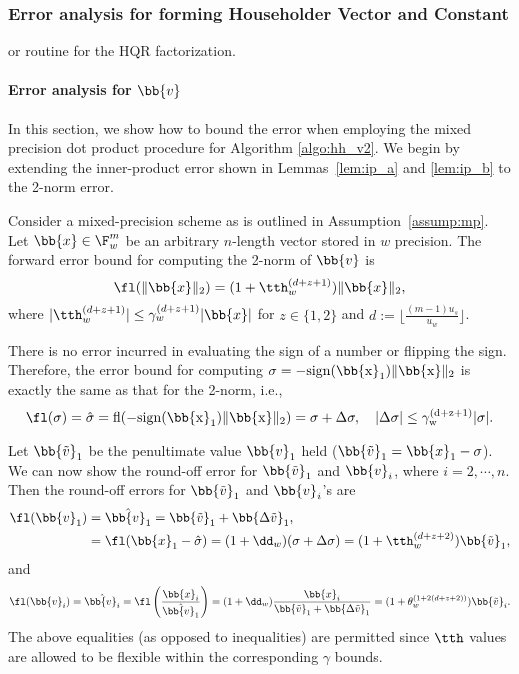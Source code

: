 \subsubsection{Error analysis for forming Householder Vector and Constant}
or routine for the HQR factorization. 

\paragraph{Error analysis for $\bb{v}$}
In this section, we show how to bound the error when employing the mixed precision dot product procedure for Algorithm \ref{algo:hh_v2}.
We begin by extending the inner-product error shown in Lemmas~\ref{lem:ip_a} and \ref{lem:ip_b} to the 2-norm error. 
\par

\begin{lemma}
	\label{lem:2norm_a}
	Consider a mixed-precision scheme as is outlined in Assumption~\ref{assump:mp}.
	Let $\bb{x}\in \F_w^{m}$ be an arbitrary $n$-length vector stored in $w$ precision.
	The forward error bound for computing the 2-norm of $\bb{v}$ is
	\begin{equation}
	\fl(\|\bb{x}\|_2)= (1+\tth_w^{(d+z+1)})\|\bb{x}\|_2,
	\end{equation}
	where $|\tth_w^{(d+z+1)}|\leq \gamma_w^{(d+z+1)}|\bb{x}|$ for $z\in\{1,2\}$ and $d:=\lfloor\frac{(m-1)u_s}{u_w}\rfloor$.
\end{lemma} 
There is no error incurred in evaluating the sign of a number or flipping the sign. 
Therefore, the error bound for computing $\sigma = -\rm{sign}(\bb{x}_1)\|\bb{x}\|_2$ is exactly the same as that for the 2-norm, i.e.,
\begin{equation}
\label{eqn:sigma}
\fl(\sigma) = \hat{\sigma} = \rm{fl}(-\rm{sign}(\bb{x}_1)\|\bb{x}\|_2) = \sigma + \Delta \sigma,\quad |\Delta\sigma| \leq \gamma_w^{(d+z+1)}|\sigma|.
\end{equation}

Let $\bb{\tilde{v}}_1$ be the penultimate value $\bb{v}_1$ held ($\bb{\tilde{v}}_1 = \bb{x}_1-\sigma$).
We can now show the round-off error for $\bb{\tilde{v}}_1$ and $\bb{v}_i$, where $i=2 , \cdots, n$. 
Then the round-off errors for $\bb{\tilde{v}}_1$ and $\bb{v}_i$'s are
\begin{align*}
\fl(\bb{v}_1)&=\hat{\bb{v}_1} = \bb{\tilde{v}}_1 + \bb{\Delta \tilde{v}}_1, \\
&= \fl(\bb{x}_1-\hat{\sigma})= (1+\dd_w) (\sigma + \Delta\sigma) = (1+\tth_w^{(d+z+2)})\bb{\tilde{v}}_1,
\end{align*}
and
\begin{equation*}
\fl(\bb{v}_i)=\hat{\bb{v}_i} = \fl\left(\frac{\bb{x}_i}{\hat{\bb{v}_1}}\right) = (1+\dd_w)\frac{\bb{x}_i}{\bb{\tilde{v}}_1 + \bb{\Delta \tilde{v}}_1}=(1+\theta_w^{(1+2(d+z+2))})\bb{\tilde{v}}_i.
\end{equation*}
The above equalities (as opposed to inequalities) are permitted since $\tth$ values are allowed to be flexible within the corresponding $\gamma$ bounds.%

